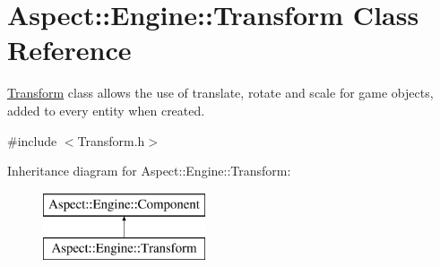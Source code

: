 \hypertarget{class_aspect_1_1_engine_1_1_transform}{}\section{Aspect\+:\+:Engine\+:\+:Transform Class Reference}
\label{class_aspect_1_1_engine_1_1_transform}


\mbox{\hyperlink{class_aspect_1_1_engine_1_1_transform}{Transform}} class allows the use of translate, rotate and scale for game objects, added to every entity when created.  




{\ttfamily \#include $<$Transform.\+h$>$}

Inheritance diagram for Aspect\+:\+:Engine\+:\+:Transform\+:\begin{figure}[H]
\begin{center}
\leavevmode
\includegraphics[height=2.000000cm]{class_aspect_1_1_engine_1_1_transform}
\end{center}
\end{figure}
